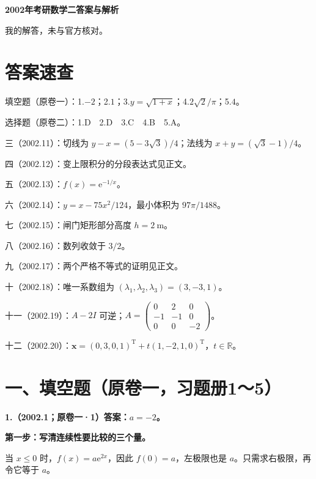 \documentclass[UTF8,11pt,fontset=windows]{ctexart}
\begin{document}
{\LARGE\bfseries 2002年考研数学二答案与解析\par}\vspace{6pt}

\begingroup\color{gray}我的解答，未与官方核对。\par\endgroup

\section*{答案速查}

\begingroup\color{gray}填空题（原卷一）：1.$-2$；2.$1$；3.$y=\sqrt{1+x}$；4.$2\sqrt2/\pi$；5.$4$。\par\endgroup

\begingroup\color{gray}选择题（原卷二）：1.D　2.D　3.C　4.B　5.A。\par\endgroup

三（2002.11）：切线为 $y-x=(5-3\sqrt3)/4$；法线为 $x+y=(\sqrt3-1)/4$。

四（2002.12）：变上限积分的分段表达式见正文。

五（2002.13）：$f(x)=\mathrm e^{-1/x}$。

六（2002.14）：$y=x-75x^2/124$，最小体积为 $97\pi/1488$。

七（2002.15）：闸门矩形部分高度 $h=2\ \mathrm m$。

八（2002.16）：数列收敛于 $3/2$。

九（2002.17）：两个严格不等式的证明见正文。

十（2002.18）：唯一系数组为 $(\lambda_1,\lambda_2,\lambda_3)=(3,-3,1)$。

十一（2002.19）：$A-2I$ 可逆；$A=\begin{pmatrix}0&2&0\\-1&-1&0\\0&0&-2\end{pmatrix}$。

十二（2002.20）：$\boldsymbol x=(0,3,0,1)^{\mathrm T}+t(1,-2,1,0)^{\mathrm T}$，$t\in\mathbb R$。

\clearpage

\section*{一、填空题（原卷一，习题册1～5）}

\textbf{1.（2002.1；原卷一·1）答案：$a=-2$。}

\textbf{第一步：写清连续性要比较的三个量。}

当 $x\le0$ 时，$f(x)=a\mathrm e^{2x}$，因此 $f(0)=a$，左极限也是 $a$。只需求右极限，再令它等于 $a$。
\end{document}
